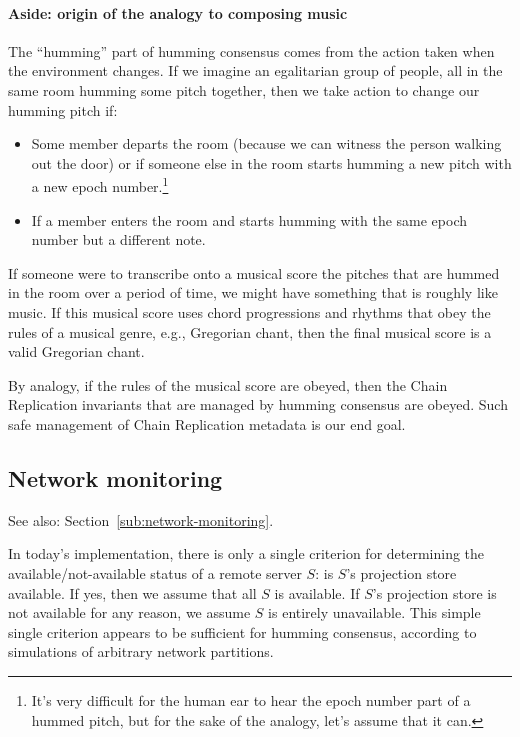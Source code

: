 \documentclass[preprint,10pt]{sigplanconf}
\begin{document}
\paragraph{Aside: origin of the analogy to composing music}
The ``humming'' part of humming consensus comes from the action taken
when the environment changes.  If we imagine an egalitarian group of
people, all in the same room humming some pitch together, then we take
action to change our humming pitch if:

\begin{itemize}
\item Some member departs the room (because we can witness the person
walking out the door) or if someone else in the room starts humming a
new pitch with a new epoch number.\footnote{It's very difficult for
  the human ear to hear the epoch number part of a hummed pitch, but
  for the sake of the analogy, let's assume that it can.}
\item If a member enters the room and starts humming with the same
  epoch number but a different note.
\end{itemize}

If someone were to transcribe onto a musical score the pitches that
are hummed in the room over a period of time, we might have something
that is roughly like music.  If this musical score uses chord progressions
and rhythms that obey the rules of a musical genre, e.g., Gregorian
chant, then the final musical score is a valid Gregorian chant.

By analogy, if the rules of the musical score are obeyed, then the
Chain Replication invariants that are managed by humming consensus are
obeyed.  Such safe management of Chain Replication metadata is our end goal.

\subsection{Network monitoring}

See also: Section~\ref{sub:network-monitoring}.

In today's implementation, there is only a single criterion for
determining the available/not-available status of a remote server $S$:
is $S$'s projection store available.  If yes, then we assume that all
$S$ is available.  If $S$'s projection store is not available for any
reason, we assume $S$ is entirely unavailable.  This simple single
criterion appears to be sufficient for humming consensus, according to
simulations of arbitrary network partitions.
\end{document}
